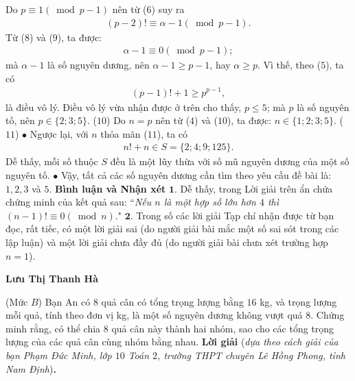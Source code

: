 \begin{multicols}{2}
	Do $p \equiv 1\left( {\bmod p - 1} \right)$  nên từ ($6$) suy ra
	\begin{align*}
		\left( {p - 2} \right)! \equiv \alpha  - 1\left( {\bmod p - 1} \right). \tag{$9$}
	\end{align*}
	Từ ($8$) và ($9$), ta được:
	\begin{align*}
		\alpha  - 1 \equiv 0\left( {\bmod p - 1} \right);
	\end{align*}
	mà $\alpha - 1$ là số nguyên dương, nên $\alpha - 1 \ge p - 1$, hay $\alpha \ge p$. Vì thế, theo ($5$), ta có
	\begin{align*}
		\left( {p - 1} \right)! + 1 \ge {p^{p - 1}},
	\end{align*}
	là điều vô lý.
	\vskip 0.05cm
	Điều vô lý vừa nhận được ở trên cho thấy, $p \le 5$; mà $p$ là số nguyên tố, nên \linebreak$p \in \{2; 3; 5\}$. \hfill      ($10$)
	\vskip 0.05cm
	Do $n = p$ nên từ ($4$) và ($10$), ta được: \linebreak$n \in \{1; 2; 3; 5\}$. \hfill ($11$)
	\vskip 0.05cm
	$\bullet$ Ngược lại, với $n$ thỏa mãn ($11$), ta có
	\begin{align*}
		n! + n \in S = \{2; 4; 9; 125\}.
	\end{align*}
	Dễ thấy, mỗi số thuộc $S$ đều là một lũy thừa với số mũ nguyên dương của một số nguyên tố.
	\vskip 0.05cm
	$\bullet$ Vậy, tất cả các số nguyên dương cần tìm theo yêu cầu đề bài là: $1, 2, 3$ và $5$.
	\vskip 0.05cm 
	\textbf{\color{thachthuctoanhoc}Bình luận và Nhận xét}
	\vskip 0.05cm
	$\pmb{1.}$ Dễ thấy, trong Lời giải trên ẩn chứa chứng minh của kết quả sau:
	\vskip 0.05cm
	``\textit{Nếu $n$ là một hợp số lớn hơn $4$ thì}  $\left( {n - 1} \right)! \equiv 0\left( {\bmod n} \right).$"
	\vskip 0.05cm
	$\pmb{2.}$ Trong số các lời giải Tạp chí nhận được từ bạn đọc, rất tiếc, có một lời giải sai (do người giải bài mắc một số sai sót trong các lập luận) và một lời giải chưa đầy đủ (do người giải bài chưa xét trường hợp $n = 1$).
	\begin{flushright}
		\textbf{\color{thachthuctoanhoc}Lưu Thị Thanh Hà}
	\end{flushright}
	{}
	(Mức $B$) Bạn An có $8$ quả cân có tổng trọng lượng bằng $16$ kg, và trọng lượng mỗi quả, tính theo đơn vị kg, là một số nguyên dương không vượt quá $8$. Chứng minh rằng, có thể chia $8$ quả cân này thành hai nhóm, sao cho các tổng trọng lượng của các quả cân cùng nhóm bằng nhau.
	\vskip 0.05cm
	\textbf{\color{thachthuctoanhoc}Lời giải} (\textit{dựa theo cách giải của bạn Phạm Đức Minh, lớp $10$ Toán $2$, trường THPT chuyên Lê Hồng Phong, tỉnh Nam Định})\textbf{\color{thachthuctoanhoc}.}

\end{multicols}
